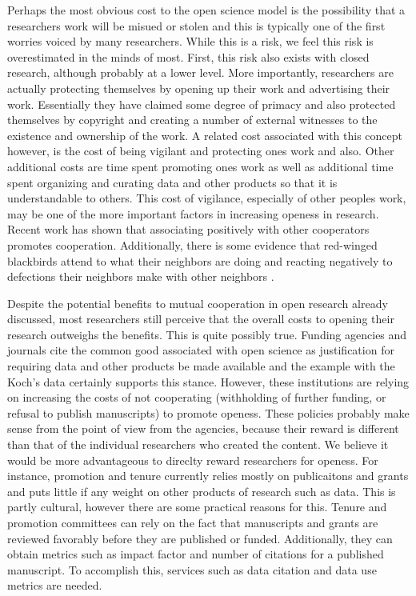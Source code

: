 \documentclass[11pt]{article} %
\begin{document}
Perhaps the most obvious cost to the open science model is the possibility that a researchers work will be misued or stolen and this is typically one of the first worries voiced by many researchers. While this is a risk, we feel this risk is overestimated in the minds of most. First, this risk also exists with closed research, although probably at a lower level. More importantly, researchers are actually protecting themselves by opening up their work and advertising their work. Essentially they have claimed some degree of primacy and also protected themselves by copyright and creating a number of external witnesses to the existence and ownership of the work. A related cost associated with this concept however, is the cost of being vigilant and protecting ones work and also. Other additional costs are time spent promoting ones work as well as additional time spent organizing and curating data and other products so that it is understandable to others. This cost of vigilance, especially of other peoples work, may be one of the more important factors in increasing openess in research. Recent work has shown that associating positively with other cooperators promotes cooperation. Additionally, there is some evidence that red-winged blackbirds attend to what their neighbors are doing and reacting negatively to defections their neighbors make with other neighbors \cite{olendorf_2004b}.

Despite the potential benefits to mutual cooperation in open research already discussed, most researchers still perceive that the overall costs to opening their research outweighs the benefits. This is quite possibly true. Funding agencies and journals cite the common good associated with open science as justification for requiring data and other products be made available and the example with the Koch's data certainly supports this stance. However, these institutions are relying on increasing the costs of not cooperating (withholding of further funding, or refusal to publish manuscripts) to promote openess. These policies probably make sense from the point of view from the agencies, because their reward is different than that of the individual researchers who created the content. We believe it would be more advantageous to direclty reward researchers for openess. For instance, promotion and tenure currently relies mostly on publicaitons and grants and puts little if any weight on other products of research such as data. This is partly cultural, however there are some practical reasons for this. Tenure and promotion committees can rely on the fact that manuscripts and grants are reviewed favorably before they are published or funded. Additionally, they can obtain metrics such as impact factor and number of citations for a published manuscript. To accomplish this, services such as data citation and data use metrics are needed.
\end{document}
